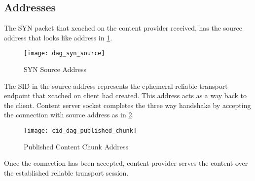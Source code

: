 \subsection{Addresses}
The SYN packet that xcached on the content provider received, has the
source address that looks like address in \ref{fig:dag_syn_source}.

\begin{figure}
  \begin{center}
    \texttt{[image: dag\_syn\_source]}
    \caption{SYN Source Address}
    \label{fig:dag_syn_source}
  \end{center}
\end{figure}
The SID in the source address represents the ephemeral reliable
transport endpoint that xcached on client had created. This address
acts as a way back to the client. Content server socket completes
the three way handshake by accepting the connection with source
address as in \ref{fig:source_cid_addr}.
\begin{figure}
  \begin{center}
    \texttt{[image: cid\_dag\_published\_chunk]}
    \caption{Published Content Chunk Address}
    \label{fig:source_cid_addr}
  \end{center}
\end{figure}
Once the connection has been accepted, content provider serves the
content over the established reliable transport session.

